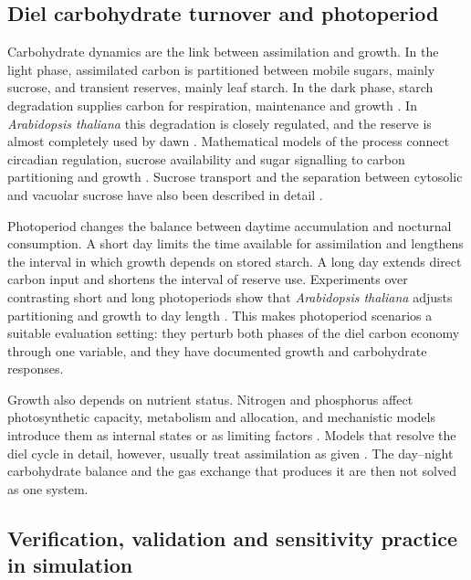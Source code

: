 \subsection{Diel carbohydrate turnover and photoperiod}

Carbohydrate dynamics are the link between assimilation and growth. In the
light phase, assimilated carbon is partitioned between mobile sugars, mainly
sucrose, and transient reserves, mainly leaf starch. In the dark phase, starch
degradation supplies carbon for respiration, maintenance and growth
\cite{Stitt2012,Smith2007}. In \textit{Arabidopsis thaliana} this degradation
is closely regulated, and the reserve is almost completely used by dawn
\cite{Graf2010,Scialdone2013,Webb2015}. Mathematical models of the process
connect circadian regulation, sucrose availability and sugar signalling to
carbon partitioning and growth \cite{Feugier2013,Seki2017}. Sucrose transport
and the separation between cytosolic and vacuolar sucrose have also been
described in detail \cite{Lohaus2000,Nadwodnik2008}.

Photoperiod changes the balance between daytime accumulation and nocturnal
consumption. A short day limits the time available for assimilation and
lengthens the interval in which growth depends on stored starch. A long day
extends direct carbon input and shortens the interval of reserve use.
Experiments over contrasting short and long photoperiods show that
\textit{Arabidopsis thaliana} adjusts partitioning and growth to day length
\cite{Sulpice2014,Mengin2017,Annunziata2017}. This makes photoperiod scenarios
a suitable evaluation setting: they perturb both phases of the diel carbon
economy through one variable, and they have documented growth and carbohydrate
responses.

Growth also depends on nutrient status. Nitrogen and phosphorus affect
photosynthetic capacity, metabolism and allocation, and mechanistic models
introduce them as internal states or as limiting factors
\cite{Gastal2002,Xu2012,Barber1995,Shen2011,Carstensen2018}. Models that
resolve the diel cycle in detail, however, usually treat assimilation as given
\cite{Scialdone2013,Graf2010,Feugier2013}. The day--night carbohydrate balance
and the gas exchange that produces it are then not solved as one system.

\subsection{Verification, validation and sensitivity practice in simulation}

